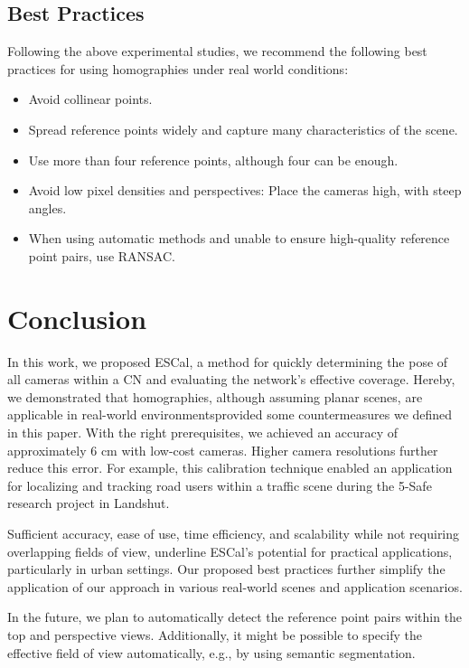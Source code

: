 \subsection{Best Practices} 
Following the above experimental studies, we recommend the following 
best practices for using homographies under real world conditions:
\begin{itemize}
	\item Avoid collinear points.
	\item Spread reference points widely and capture many characteristics of the scene.
	\item Use more than four reference points, although four can be enough.
	\item Avoid low pixel densities and perspectives: Place the 
		cameras high, with steep angles.
	\item When using automatic methods and unable to ensure high-quality reference point pairs, use RANSAC.
\end{itemize}

\section{Conclusion}
\label{sec:conclusion}
In this work, we proposed ESCal, a method for quickly determining the pose of all 
cameras within a CN and evaluating the network's effective coverage. 
Hereby, we demonstrated that homographies, although assuming planar 
scenes, are applicable in real-world environments\textemdash provided some 
countermeasures we defined in this paper. With the right prerequisites, 
we achieved an accuracy of approximately $6$ cm with low-cost cameras. 
Higher camera resolutions further reduce this error. For example, 
this calibration technique enabled an application for localizing 
and tracking road users within a traffic scene during the 
5-Safe research project in Landshut.

Sufficient accuracy, ease of use, time efficiency, and scalability while 
not requiring overlapping fields of view, underline ESCal's potential 
for practical applications, particularly in urban settings. 
Our proposed best practices further simplify the application of our 
approach in various real-world scenes and application scenarios. 

In the future, we plan to automatically detect the reference point pairs 
within the top and perspective views. Additionally, it might be possible 
to specify the effective field of view automatically, e.g., by using 
semantic segmentation.
